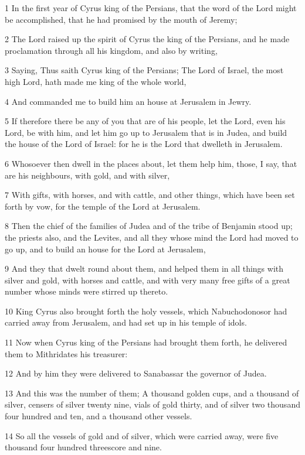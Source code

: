 \par 1 In the first year of Cyrus king of the Persians, that the word of the Lord might be accomplished, that he had promised by the mouth of Jeremy;
\par 2 The Lord raised up the spirit of Cyrus the king of the Persians, and he made proclamation through all his kingdom, and also by writing,
\par 3 Saying, Thus saith Cyrus king of the Persians; The Lord of Israel, the most high Lord, hath made me king of the whole world,
\par 4 And commanded me to build him an house at Jerusalem in Jewry.
\par 5 If therefore there be any of you that are of his people, let the Lord, even his Lord, be with him, and let him go up to Jerusalem that is in Judea, and build the house of the Lord of Israel: for he is the Lord that dwelleth in Jerusalem.
\par 6 Whosoever then dwell in the places about, let them help him, those, I say, that are his neighbours, with gold, and with silver,
\par 7 With gifts, with horses, and with cattle, and other things, which have been set forth by vow, for the temple of the Lord at Jerusalem.
\par 8 Then the chief of the families of Judea and of the tribe of Benjamin stood up; the priests also, and the Levites, and all they whose mind the Lord had moved to go up, and to build an house for the Lord at Jerusalem,
\par 9 And they that dwelt round about them, and helped them in all things with silver and gold, with horses and cattle, and with very many free gifts of a great number whose minds were stirred up thereto.
\par 10 King Cyrus also brought forth the holy vessels, which Nabuchodonosor had carried away from Jerusalem, and had set up in his temple of idols.
\par 11 Now when Cyrus king of the Persians had brought them forth, he delivered them to Mithridates his treasurer:
\par 12 And by him they were delivered to Sanabassar the governor of Judea.
\par 13 And this was the number of them; A thousand golden cups, and a thousand of silver, censers of silver twenty nine, vials of gold thirty, and of silver two thousand four hundred and ten, and a thousand other vessels.
\par 14 So all the vessels of gold and of silver, which were carried away, were five thousand four hundred threescore and nine.
